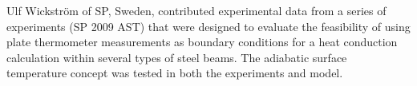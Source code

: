 \documentclass[11pt]{book}
\begin{document}
Ulf Wickstr\"{o}m of SP, Sweden, contributed experimental data from a series of experiments (SP 2009 AST) that were designed to
evaluate the feasibility of using plate thermometer measurements as boundary conditions for a heat conduction calculation within several types of
steel beams. The adiabatic surface temperature concept was tested in both the experiments and model.





\tableofcontents
\listoffigures
\listoftables

\mainmatter












%




\end{document}
